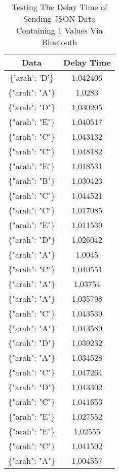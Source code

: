 \begin{table}[!ht]
  \centering
  \caption{Testing The Delay Time of Sending JSON Data Containing 1 Values Via Bluetooth}
  \label{tbl:delayBluetoothJSON1}
  \begin{tabular}{|c|c|}
  \hline
  Data               & Delay Time  \\ \hline
  \{'arah': 'D'\}    & 1,042406    \\ \hline
  \{"arah": "A"\}    & 1,0283      \\ \hline
  \{"arah": "D"\}    & 1,030205    \\ \hline
  \{"arah": "E"\}    & 1,040517    \\ \hline
  \{"arah": "C"\}    & 1,043132    \\ \hline
  \{"arah": "C"\}    & 1,048182    \\ \hline
  \{"arah": "E"\}    & 1,018531    \\ \hline
  \{"arah": "B"\}    & 1,030423    \\ \hline
  \{"arah": "C"\}    & 1,044521    \\ \hline
  \{"arah": "C"\}    & 1,017085    \\ \hline
  \{"arah": "E"\}    & 1,011539    \\ \hline
  \{"arah": "D"\}    & 1,026042    \\ \hline
  \{"arah": "A"\}    & 1,0045      \\ \hline
  \{"arah": "C"\}    & 1,040551    \\ \hline
  \{"arah": "A"\}    & 1,03754     \\ \hline
  \{"arah": "A"\}    & 1,035798    \\ \hline
  \{"arah": "C"\}    & 1,043539    \\ \hline
  \{"arah": "A"\}    & 1,043589    \\ \hline
  \{"arah": "D"\}    & 1,039232    \\ \hline
  \{"arah": "A"\}    & 1,034528    \\ \hline
  \{"arah": "C"\}    & 1,047264    \\ \hline
  \{"arah": "D"\}    & 1,043302    \\ \hline
  \{"arah": "C"\}    & 1,041653    \\ \hline
  \{"arah": "E"\}    & 1,027552    \\ \hline
  \{"arah": "E"\}    & 1,02555     \\ \hline
  \{"arah": "C"\}    & 1,041592    \\ \hline
  \{"arah": "A"\}    & 1,004557    \\ \hline

\end{tabular}
\end{table}
